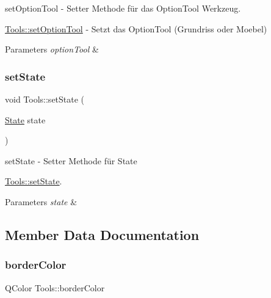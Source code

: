 set\+Option\+Tool -\/ Setter Methode für das Option\+Tool Werkzeug. 

\hyperlink{class_tools_af69d4aa896ef3e1b06ce65e5df53f060}{Tools\+::set\+Option\+Tool} -\/ Setzt das Option\+Tool (Grundriss oder Moebel)


\begin{DoxyParams}{Parameters}
{\em option\+Tool} & \\
\hline
\end{DoxyParams}
\mbox{\label{class_tools_abdf68db9740ba504701fe00d97a031e2}} 
\subsubsection{\texorpdfstring{set\+State}{setState}}
{\footnotesize\ttfamily void Tools\+::set\+State (\begin{DoxyParamCaption}\item[{\hyperlink{class_tools_a2847c269682818722541d9002fdf0824}{State}}]{state }\end{DoxyParamCaption})\hspace{0.3cm}{\ttfamily [slot]}}



set\+State -\/ Setter Methode für State 

\hyperlink{class_tools_abdf68db9740ba504701fe00d97a031e2}{Tools\+::set\+State}.


\begin{DoxyParams}{Parameters}
{\em state} & \\
\hline
\end{DoxyParams}


\subsection{Member Data Documentation}
\mbox{\label{class_tools_af7de157c4f6575664512accd32d93a43}} 
\subsubsection{\texorpdfstring{border\+Color}{borderColor}}
{\footnotesize\ttfamily Q\+Color Tools\+::border\+Color\hspace{0.3cm}{\ttfamily [protected]}}

